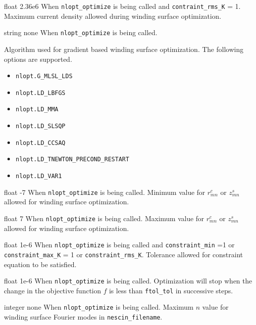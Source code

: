 \myhrule

{float}
{2.36e6}
{When \texttt{nlopt\_optimize} is being called and \texttt{contraint\_rms\_K} = 1.}
{Maximum current density allowed during winding surface optimization. }

\myhrule

{string}
{none}
{When \texttt{nlopt\_optimize} is being called. }
{Algorithm used for gradient based winding surface optimization. The following options are supported.
\begin{itemize}
\item \texttt{nlopt.G\_MLSL\_LDS}
\item \texttt{nlopt.LD\_LBFGS}
\item \texttt{nlopt.LD\_MMA}
\item \texttt{nlopt.LD\_SLSQP} 
\item \texttt{nlopt.LD\_CCSAQ}
\item \texttt{nlopt.LD\_TNEWTON\_PRECOND\_RESTART}
\item \texttt{nlopt.LD\_VAR1}
\end{itemize}
}

\myhrule

{float}
{-7}
{When \texttt{nlopt\_optimize} is being called. }
{Minimum value for $r_{mn}^c$ or $z_{mn}^s$ allowed for winding surface optimization.}

\myhrule

{float}
{7}
{When \texttt{nlopt\_optimize} is being called. }
{Maximum value for $r_{mn}^c$ or $z_{mn}^s$ allowed for winding surface optimization.}

\myhrule

{float}
{1e-6}
{When \texttt{nlopt\_optimize} is being called and \texttt{constraint\_min} =1 or \texttt{constraint\_max\_K} = 1 or \texttt{constraint\_rms\_K}.}
{Tolerance allowed for constraint equation to be satisfied.}

\myhrule

{float}
{1e-6}
{When \texttt{nlopt\_optimize} is being called.}
{Optimization will stop when the change in the objective function $f$ is less than \texttt{ftol\_tol} in successive steps.}

\myhrule

{integer}
{none}
{When \texttt{nlopt\_optimize} is being called.}
{Maximum $n$ value for winding surface Fourier modes in \texttt{nescin\_filename}.}

\myhrule


